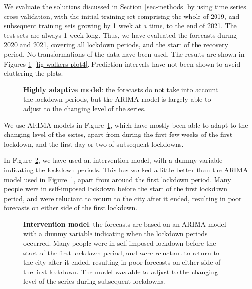 \documentclass[11pt,a4paper,]{article}
\begin{document}
We evaluate the solutions discussed in Section~\ref{sec-methods} by
using time series cross-validation, with the initial training set
comprising the whole of 2019, and subsequent training sets growing by 1
week at a time, to the end of 2021. The test sets are always 1 week
long. Thus, we have evaluated the forecasts during 2020 and 2021,
covering all lockdown periods, and the start of the recovery period. No
transformations of the data have been used. The results are shown in
Figures \ref{fig-walkers-plot1}--\ref{fig-walkers-plot4}. Prediction
intervals have not been shown to avoid cluttering the plots.

\begin{figure}


\caption{\label{fig-walkers-plot1}\textbf{Highly adaptive model}: the
forecasts do not take into account the lockdown periods, but the ARIMA
model is largely able to adjust to the changing level of the series.}

\end{figure}%

We use ARIMA models in Figure~\ref{fig-walkers-plot1}, which have mostly
been able to adapt to the changing level of the series, apart from
during the first few weeks of the first lockdown, and the first day or
two of subsequent lockdowns.

In Figure~\ref{fig-walkers-plot2}, we have used an intervention model,
with a dummy variable indicating the lockdown periods. This has worked a
little better than the ARIMA model used in
Figure~\ref{fig-walkers-plot1}, apart from around the first lockdown
period. Many people were in self-imposed lockdown before the start of
the first lockdown period, and were reluctant to return to the city
after it ended, resulting in poor forecasts on either side of the first
lockdown.

\begin{figure}


\caption{\label{fig-walkers-plot2}\textbf{Intervention model}: the
forecasts are based on an ARIMA model with a dummy variable indicating
when the lockdown periods occurred. Many people were in self-imposed
lockdown before the start of the first lockdown period, and were
reluctant to return to the city after it ended, resulting in poor
forecasts on either side of the first lockdown. The model was able to
adjust to the changing level of the series during subsequent lockdowns.}

\end{figure}%
\end{document}
